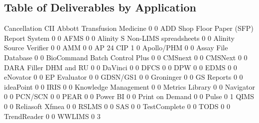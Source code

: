 \documentclass{article}
\begin{document}
\subsection{Table of Deliverables by Application}
\begin{Schunk}
\begin{Soutput}
                                           Cancellation CII
  Abbott Transfusion Medicine                         0   0
  ADD Shop Floor Paper (SFP) Report System            0   0
  AFMS                                                0   0
  Alinity S Non-LIMS spreadsheets                     0   0
  Alinity Source Verifier                             0   0
  AMM                                                 0   0
  AP 24 CIP                                           1   0
  Apollo/PHM                                          0   0
  Assay File Database                                 0   0
  BioCommand Batch Control Plus                       0   0
  CMSnext                                             0   0
  CMSNext                                             0   0
  DARA Filler DHM and RU                              0   0
  DaVinci                                             0   0
  DFCS                                                0   0
  DPW                                                 0   0
  EDMS                                                0   0
  eNovator                                            0   0
  EP Evaluator                                        0   0
  GDSN/GS1                                            0   0
  Groninger                                           0   0
  GS Reports                                          0   0
  ideaPoint                                           0   0
  IRIS                                                0   0
  Knowledge Management                                0   0
  Metrics Library                                     0   0
  Navigator                                           0   0
  PCN/SCN                                             0   0
  PEAR                                                0   0
  Power BI                                            0   0
  Print on Demand                                     0   0
  Pulse                                               0   1
  QIMS                                                0   0
  Reliasoft Xfmea                                     0   0
  RSLMS                                               0   0
  SAS                                                 0   0
  TestComplete                                        0   0
  TODS                                                0   0
  TrendReader                                         0   0
  WWLIMS                                              0   3
                                          

\end{Soutput}
\end{Schunk}
\end{document}
